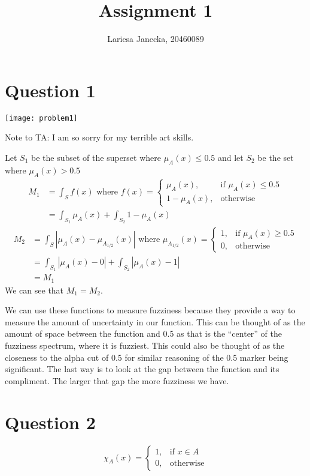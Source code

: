 \documentclass{article}
\begin{document}
\title{Assignment 1}
\author{Lariesa Janecka, 20460089}
\maketitle


\section*{Question 1}
\texttt{[image: problem1]}

Note to TA: I am so sorry for my terrible art skills.

Let $S_1$ be the subset of the superset where $\mu_A(x) \leq 0.5$ and let $S_2$ be the set where $\mu_A(x) > 0.5$
\begin{align*}
	M_1 &= \int_S f(x) \text{ where } f(x) =
	\begin{cases}
	 	\mu_A(x), & \text{if } \mu_A(x) \leq 0.5\\
	 	1- \mu_A(x), &\text{otherwise}
	 \end{cases} \\
	 &= \int_{S_1} \mu_A(x) + \int_{S_2} 1-\mu_A(x)
\end{align*}
\begin{align*}
	M_2 &= \int_S |\mu_A(x) - \mu_{A_{1/2}}(x)| \text{ where } \mu_{A_{1/2}}(x) =
	\begin{cases}
		1, &\text{if } \mu_A(x) \geq 0.5\\
		0, &\text{otherwise}
	\end{cases}\\
	&= \int_{S_1}|\mu_A(x) - 0| + \int_{S_2} |\mu_A(x) - 1|\\
	&= M_1
\end{align*}
We can see that $M_1 = M_2$.



We can use these functions to measure fuzziness because they provide a way to measure the amount of uncertainty in our function. This can be thought of as the amount of space between the function and 0.5 as that is the ``center'' of the fuzziness spectrum, where it is fuzziest. This could also be thought of as the closeness to the alpha cut of 0.5 for similar reasoning of the 0.5 marker being significant. The last way is to look at the gap between the function and its compliment. The larger that gap the more fuzziness we have.

\section*{Question 2}
\[
    \chi_{A}(x)=
\begin{cases}
    1,& \text{if } x\in A\\
    0,& \text{otherwise}
\end{cases}
\]
\end{document}
